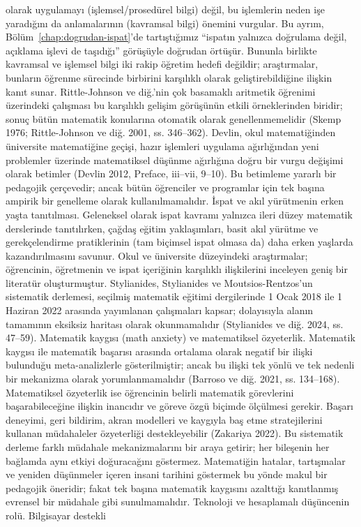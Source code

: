 olarak uygulamayı (işlemsel/prosedürel bilgi) değil, bu işlemlerin neden işe yaradığını da anlamalarının (kavramsal bilgi) önemini vurgular. Bu ayrım, Bölüm~\ref{chap:dogrudan-ispat}’de tartıştığımız “ispatın yalnızca doğrulama değil, açıklama işlevi de taşıdığı” görüşüyle doğrudan örtüşür. Bununla birlikte kavramsal ve işlemsel bilgi iki rakip öğretim hedefi değildir; araştırmalar, bunların öğrenme sürecinde birbirini karşılıklı olarak geliştirebildiğine ilişkin kanıt sunar. Rittle-Johnson ve diğ.’nin çok basamaklı aritmetik öğrenimi üzerindeki çalışması bu karşılıklı gelişim görüşünün etkili örneklerinden biridir; sonuç bütün matematik konularına otomatik olarak genellenmemelidir (Skemp 1976; Rittle-Johnson ve diğ. 2001, ss. 346–362). Devlin, okul matematiğinden üniversite matematiğine geçişi, hazır işlemleri uygulama ağırlığından yeni problemler üzerinde matematiksel düşünme ağırlığına doğru bir vurgu değişimi olarak betimler (Devlin 2012, Preface, iii–vii, 9–10). Bu betimleme yararlı bir pedagojik çerçevedir; ancak bütün öğrenciler ve programlar için tek başına ampirik bir genelleme olarak kullanılmamalıdır. İspat ve akıl yürütmenin erken yaşta tanıtılması. Geleneksel olarak ispat kavramı yalnızca ileri düzey matematik derslerinde tanıtılırken, çağdaş eğitim yaklaşımları, basit akıl yürütme ve gerekçelendirme pratiklerinin (tam biçimsel ispat olmasa da) daha erken yaşlarda kazandırılmasını savunur. Okul ve üniversite düzeyindeki araştırmalar; öğrencinin, öğretmenin ve ispat içeriğinin karşılıklı ilişkilerini inceleyen geniş bir literatür oluşturmuştur. Stylianides, Stylianides ve Moutsios-Rentzos’un sistematik derlemesi, seçilmiş matematik eğitimi dergilerinde 1 Ocak 2018 ile 1 Haziran 2022 arasında yayımlanan çalışmaları kapsar; dolayısıyla alanın tamamının eksiksiz haritası olarak okunmamalıdır (Stylianides ve diğ. 2024, ss. 47–59). Matematik kaygısı (math anxiety) ve matematiksel özyeterlik. Matematik kaygısı ile matematik başarısı arasında ortalama olarak negatif bir ilişki bulunduğu meta-analizlerle gösterilmiştir; ancak bu ilişki tek yönlü ve tek nedenli bir mekanizma olarak yorumlanmamalıdır (Barroso ve diğ. 2021, ss. 134–168). Matematiksel özyeterlik ise öğrencinin belirli matematik görevlerini başarabileceğine ilişkin inancıdır ve göreve özgü biçimde ölçülmesi gerekir. Başarı deneyimi, geri bildirim, akran modelleri ve kaygıyla baş etme stratejilerini kullanan müdahaleler özyeterliği destekleyebilir (Zakariya 2022). Bu sistematik derleme farklı müdahale mekanizmalarını bir araya getirir; her bileşenin her bağlamda aynı etkiyi doğuracağını göstermez. Matematiğin hatalar, tartışmalar ve yeniden düşünmeler içeren insani tarihini göstermek bu yönde makul bir pedagojik öneridir; fakat tek başına matematik kaygısını azalttığı kanıtlanmış evrensel bir müdahale gibi sunulmamalıdır. Teknoloji ve hesaplamalı düşüncenin rolü. Bilgisayar destekli

